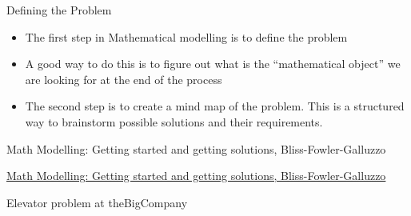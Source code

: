 \begin{module}{Defining the Problem}
	\label{define}

	
	
\end{module}


\begin{lesson}

	\begin{itemize}
		\item The first step in Mathematical modelling is to define the problem
		\item A good way to do this is to figure out what is the ``mathematical object'' we are looking for at the end of the process

		\item The second step is to create a mind map of the problem. This is a structured way to brainstorm possible solutions and their requirements.
	\end{itemize}
	

\begin{annotation}
	\begin{goals}
	Math Modelling: Getting started and getting solutions, Bliss-Fowler-Galluzzo
	
	\hfill {}	
	\end{goals}
\end{annotation}
	 \href{https://m3challenge.siam.org/resources/modeling-handbook}{Math Modelling: Getting started and getting solutions, Bliss-Fowler-Galluzzo}

\end{lesson}



\question
\label{elevator-define}
Elevator problem at theBigCompany



